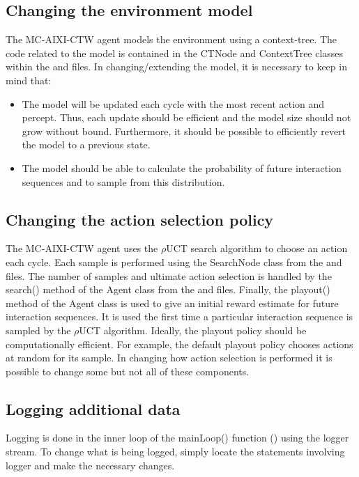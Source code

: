 \documentclass[a4paper,11pt]{article}
\begin{document}
\subsection{Changing the environment model}
The MC-AIXI-CTW agent models the environment using a context-tree. The code related to the model is contained in the CTNode and ContextTree classes within the  and  files. In changing/extending the model, it is necessary to keep in mind that:
\begin{itemize}
\item The model will be updated each cycle with the most recent action and percept. Thus, each update should be efficient and the model size should not grow without bound. Furthermore, it should be possible to efficiently revert the model to a previous state.

\item The model should be able to calculate the probability of future interaction sequences and to sample from this distribution.
\end{itemize}


\subsection{Changing the action selection policy}
The MC-AIXI-CTW agent uses the $\rho$UCT search algorithm to choose an action each cycle. Each sample is performed using the SearchNode class from the  and  files. The number of samples and ultimate action selection is handled by the search() method of the Agent class from the  and  files. Finally, the playout() method of the Agent class is used to give an initial reward estimate for future interaction sequences. It is used the first time a particular interaction sequence is sampled by the $\rho$UCT algorithm. Ideally, the playout policy should be computationally efficient. For example, the default playout policy chooses actions at random for its sample. In changing how action selection is performed it is possible to change some but not all of these components.


\subsection{Logging additional data}
Logging is done in the inner loop of the mainLoop() function () using the logger stream. To change what is being logged, simply locate the statements involving logger and make the necessary changes.
\end{document}
